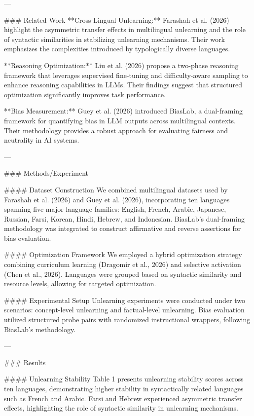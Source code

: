 ---

### Related Work  
**Cross-Lingual Unlearning:** Farashah et al. (2026) highlight the asymmetric transfer effects in multilingual unlearning and the role of syntactic similarities in stabilizing unlearning mechanisms. Their work emphasizes the complexities introduced by typologically diverse languages.

**Reasoning Optimization:** Liu et al. (2026) propose a two-phase reasoning framework that leverages supervised fine-tuning and difficulty-aware sampling to enhance reasoning capabilities in LLMs. Their findings suggest that structured optimization significantly improves task performance.

**Bias Measurement:** Guey et al. (2026) introduced BiasLab, a dual-framing framework for quantifying bias in LLM outputs across multilingual contexts. Their methodology provides a robust approach for evaluating fairness and neutrality in AI systems.

---

### Methods/Experiment  

#### Dataset Construction  
We combined multilingual datasets used by Farashah et al. (2026) and Guey et al. (2026), incorporating ten languages spanning five major language families: English, French, Arabic, Japanese, Russian, Farsi, Korean, Hindi, Hebrew, and Indonesian. BiasLab’s dual-framing methodology was integrated to construct affirmative and reverse assertions for bias evaluation.

#### Optimization Framework  
We employed a hybrid optimization strategy combining curriculum learning (Dragomir et al., 2026) and selective activation (Chen et al., 2026). Languages were grouped based on syntactic similarity and resource levels, allowing for targeted optimization.

#### Experimental Setup  
Unlearning experiments were conducted under two scenarios: concept-level unlearning and factual-level unlearning. Bias evaluation utilized structured probe pairs with randomized instructional wrappers, following BiasLab’s methodology.

---

### Results  

#### Unlearning Stability  
Table 1 presents unlearning stability scores across ten languages, demonstrating higher stability in syntactically related languages such as French and Arabic. Farsi and Hebrew experienced asymmetric transfer effects, highlighting the role of syntactic similarity in unlearning mechanisms.

